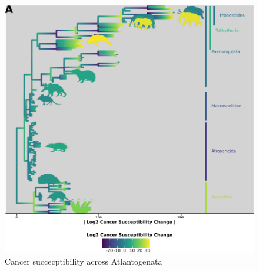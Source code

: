 \documentclass[]{elsarticle} %
\begin{document}
\begin{figure}

\includegraphics[width=6in]{paper_PLOS_draft_files/figure-latex/Figure2-1} \hfill{}

\caption{Cancer succecptibility across Atlantogenata}\label{fig:Figure2}
\end{figure}
\end{document}
